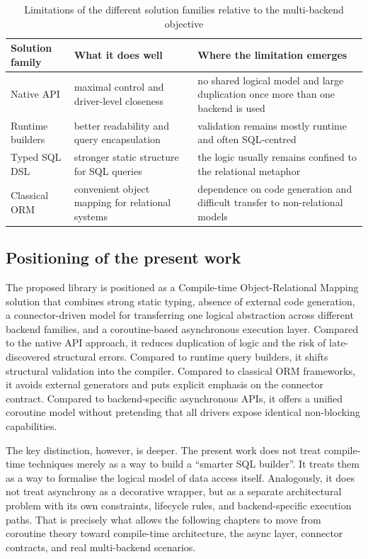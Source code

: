 \begin{table}[H]
\centering
\caption{Limitations of the different solution families relative to the multi-backend objective}
\label{tab:existing_solution_limitations}
\begin{tabularx}{\textwidth}{L{3.2cm}L{3.3cm}Y}
\toprule
\textbf{Solution family} & \textbf{What it does well} & \textbf{Where the limitation emerges} \\
\midrule
Native API & maximal control and driver-level closeness & no shared logical model and large duplication once more than one backend is used \\
Runtime builders & better readability and query encapsulation & validation remains mostly runtime and often SQL-centred \\
Typed SQL DSL & stronger static structure for SQL queries & the logic usually remains confined to the relational metaphor \\
Classical ORM & convenient object mapping for relational systems & dependence on code generation and difficult transfer to non-relational models \\
\bottomrule
\end{tabularx}
\end{table}

\subsection{Positioning of the present work}

The proposed library is positioned as a Compile-time Object-Relational Mapping solution that combines strong static typing, absence of external code generation, a connector-driven model for transferring one logical abstraction across different backend families, and a coroutine-based asynchronous execution layer. Compared to the native API approach, it reduces duplication of logic and the risk of late-discovered structural errors. Compared to runtime query builders, it shifts structural validation into the compiler. Compared to classical ORM frameworks, it avoids external generators and puts explicit emphasis on the connector contract. Compared to backend-specific asynchronous APIs, it offers a unified coroutine model without pretending that all drivers expose identical non-blocking capabilities.

The key distinction, however, is deeper. The present work does not treat compile-time techniques merely as a way to build a ``smarter SQL builder''. It treats them as a way to formalise the logical model of data access itself. Analogously, it does not treat asynchrony as a decorative wrapper, but as a separate architectural problem with its own constraints, lifecycle rules, and backend-specific execution paths. That is precisely what allows the following chapters to move from coroutine theory toward compile-time architecture, the async layer, connector contracts, and real multi-backend scenarios.

